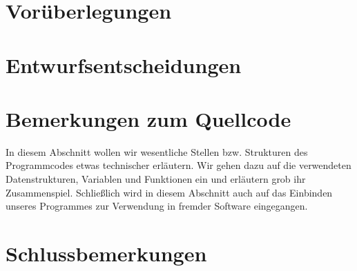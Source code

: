 \documentclass[12pt,a4paper]{article}
\begin{document}
\section{Vorüberlegungen}
	
\clearpage
\section{Entwurfsentscheidungen}
	
	
	
	
%
%
\clearpage
\section{Bemerkungen zum Quellcode}
In diesem Abschnitt wollen wir wesentliche Stellen bzw. Strukturen des Programmcodes etwas technischer erläutern. Wir gehen dazu auf die verwendeten Datenstrukturen, Variablen und Funktionen ein und erläutern grob ihr Zusammenspiel. Schließlich wird in diesem Abschnitt auch auf das Einbinden unseres Programmes zur Verwendung in fremder Software eingegangen.
	
	
	
%
%
\clearpage
\section{Schlussbemerkungen}

\newpage
\printbibliography
\end{document}
